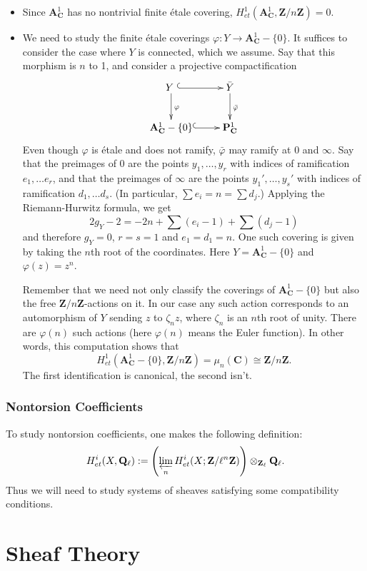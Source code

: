 \begin{itemize}
\item 
Since $\mathbf{A}^1_\mathbf{C}$ has no nontrivial finite \'etale covering, $H_{et}^1 (\mathbf{A}^1_\mathbf{C}, \mathbf{Z}/n\mathbf{Z}) = 0$.
\item
We need to study the finite \'etale coverings $\varphi: Y \to \mathbf{A}^1_\mathbf{C}-\{0\}$. It suffices to consider the case where $Y$ is connected, which we assume. Say that this morphism is $n$ to 1, and consider a projective compactification
$$
\xymatrix{
{Y\ } \ar@{^{(}->}[r] \ar^{\varphi}[d] & {\bar Y} \ar^{\bar\varphi}[d] \\
{\mathbf{A}^1_\mathbf{C}-\{0\}} \ar@{^{(}->}[r]  &{\mathbf{P}^1_\mathbf{C}}
}
$$
Even though $\varphi$ is \'etale and does not ramify, $\bar{\varphi}$ may ramify at 0 and $\infty$. Say that the preimages of 0 are the points $y_1, \dots, y_r$ with indices of ramification $e_1, \dots e_r$, and that the preimages of $\infty$ are the points $y_1', \dots, y_s'$ with indices of ramification $d_1, \dots d_s$. (In particular, $\sum e_i = n = \sum d_j$.) Applying the Riemann-Hurwitz formula, we get
$$
2 g_Y - 2 = -2n + \sum (e_i - 1) + \sum (d_j - 1)
$$
and therefore $g_Y = 0$, $r=s=1$ and $e_1 = d_1 = n$. One such covering is given by taking the $n$th root of the coordinates. Here $Y = {\mathbf{A}^1_\mathbf{C}-\{0\}}$ and $\varphi (z) = z^n$. 

Remember that we need not only classify the coverings of ${\mathbf{A}^1_\mathbf{C}-\{0\}}$ but also the free $\mathbf{Z}/n\mathbf{Z}$-actions on it. In our case any such action corresponds to an automorphism of $Y$ sending $z$ to $\zeta_n z$, where $\zeta_n$ is an $n$th root of unity. There are $\varphi(n)$ such actions (here $\varphi(n)$ means the Euler function). 
In other words, this computation shows that
$$
H_{et}^1 (\mathbf{A}^1_\mathbf{C}-\{0\}, \mathbf{Z}/n\mathbf{Z}) = \mu_n (\mathbf{C}) \cong \mathbf{Z}/n\mathbf{Z}.
$$
The first identification is canonical, the second isn't.
\end{itemize}

\subsubsection{Nontorsion Coefficients}

To study nontorsion coefficients, one makes the following definition:
$$
H_{et}^i (X, \mathbf{Q}_\ell) := \left( \varprojlim_n H_{et}^i (X; \mathbf{Z}/\ell^n\mathbf{Z}) \right) \otimes_{\mathbf{Z}_\ell} \mathbf{Q}_\ell.
$$
Thus we will need to study systems of sheaves satisfying some compatibility conditions.\section{Sheaf Theory} %

